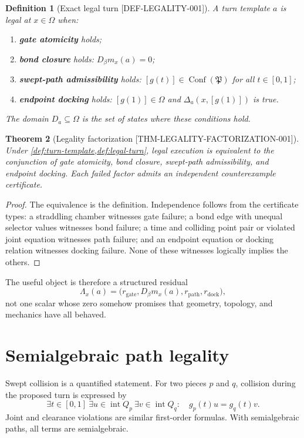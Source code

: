 \documentclass[11pt,openany]{book}
\newcommand{\Conf}{\operatorname{Conf}}
\newcommand{\Int}{\operatorname{int}}
\newcommand{\Atlas}{\mathfrak P}
\newcommand{\States}{\Omega}
\newcommand{\claimid}[1]{\textnormal{\sffamily\footnotesize[#1]}}
\theoremstyle{polyplain}
\newtheorem{theorem}{Theorem}[chapter]
\theoremstyle{polydef}
\newtheorem{definition}[theorem]{Definition}
\begin{document}
\begin{definition}[Exact legal turn \claimid{DEF-LEGALITY-001}]
\label{def:legal-turn}
A turn template $a$ is legal at $x\in\States$ when:
\begin{enumerate}
  \item \textbf{gate atomicity} holds;
  \item \textbf{bond closure} holds: $D_\beta m_x(a)=0$;
  \item \textbf{swept-path admissibility} holds: $[g(t)]\in\Conf(\Atlas)$ for all $t\in[0,1]$;
  \item \textbf{endpoint docking} holds: $[g(1)]\in\States$ and $\Delta_a(x,[g(1)])$ is true.
\end{enumerate}
The domain $D_a\subseteq\States$ is the set of states where these conditions hold.
\end{definition}

\begin{theorem}[Legality factorization \claimid{THM-LEGALITY-FACTORIZATION-001}]
\label{thm:legality-factorization}
Under \cref{def:turn-template,def:legal-turn}, legal execution is equivalent to the conjunction of gate atomicity, bond closure, swept-path admissibility, and endpoint docking. Each failed factor admits an independent counterexample certificate.
\end{theorem}

\begin{proof}
The equivalence is the definition. Independence follows from the certificate types: a straddling chamber witnesses gate failure; a bond edge with unequal selector values witnesses bond failure; a time and colliding point pair or violated joint equation witnesses path failure; and an endpoint equation or docking relation witnesses docking failure. None of these witnesses logically implies the others.
\end{proof}

The useful object is therefore a structured residual
\[
\Lambda_x(a)=
\bigl(r_{\mathrm{gate}},D_\beta m_x(a),r_{\mathrm{path}},r_{\mathrm{dock}}\bigr),
\]
not one scalar whose zero somehow promises that geometry, topology, and mechanics have all behaved.

\section{Semialgebraic path legality}
\label{sec:path-legality}

Swept collision is a quantified statement. For two pieces $p$ and $q$, collision during the proposed turn is expressed by
\[
\exists t\in[0,1]\ \exists u\in\Int Q_p\ \exists v\in\Int Q_q:
\quad g_p(t)u=g_q(t)v.
\]
Joint and clearance violations are similar first-order formulas. With semialgebraic paths, all terms are semialgebraic.
\end{document}
